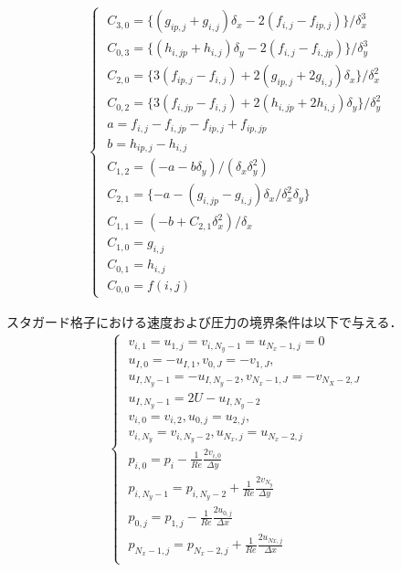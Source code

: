 \documentclass[twocolumn,oneside,a4paper]{article}
\begin{document}
\begin{eqnarray*}
\begin{cases}
\;C_{3,0} = \{ (g_{ip,j} + g_{i,j}) \delta_x - 2(f_{i,j}-f_{ip,j})\}/ \delta_x^3 \\
\;C_{0,3} = \{ (h_{i,jp} + h_{i,j}) \delta_y - 2(f_{i,j}-f_{i,jp})\}/ \delta_y^3 \\
\;C_{2,0} = \{ 3(f_{ip,j} - f_{i,j})  + 2(g_{ip,j}+2g_{i,j}) \delta_x \}/ \delta_x^2 \\
\;C_{0,2} = \{ 3(f_{i,jp} - f_{i,j})  + 2(h_{i,jp}+2h_{i,j}) \delta_y \}/ \delta_y^2 \\
\;a = f_{i,j} - f_{i,jp} - f_{ip,j} + f_{ip,jp} \\
\;b = h_{ip,j} - h_{i,j} \\
\;C_{1,2} = (-a-b\delta_y) / (\delta_x \delta_y^2)\\
\;C_{2,1} = \{  -a-(g_{i,jp} - g_{i,j})  \delta_x / \delta_x^2 \delta_y  \}\\
\;C_{1,1} = (-b+C_{2,1}\delta_x^2)/\delta_x\\
\;C_{1,0} = g_{i,j} \\
\;C_{0,1} = h_{i,j} \\
\;C_{0,0} = f(i,j)

\end{cases}  
\end{eqnarray*}

スタガード格子における速度および圧力の境界条件は以下で与える．
\begin{eqnarray}\label{eq:vcondition}
\begin{cases}
\;v_{i,1} = u_{1,j} = v_{i,N_y-1} = u_{N_x-1,j} = 0\nonumber\\
\;u_{I,0} = -u_{I,1}, v_{0,J} = -v_{1,J}, \nonumber\\
\; u_{I,N_y-1} = -u_{I,N_y-2}, v_{N_x-1,J} = -v_{N_X-2,J} \nonumber\\
\; u_{I,N_y-1} = 2U - u_{I,N_y-2} \nonumber\\
\; v_{i,0} = v_{i,2}, u_{0,j} = u_{2,j}, \nonumber\\
\; v_{i,N_y} = v_{i,N_y-2}, u_{N_x,j} = u_{N_x-2,j} \\
\;p_{i,0} = p_i - \frac{1}{Re}\frac{2v_{i,0}}{\Delta y} \nonumber\\
\;p_{i,N_y-1} = p_{i,N_y-2} + \frac{1}{Re}\frac{2v_{N_y}}{\Delta y} \nonumber\\
\;p_{0,j} = p_{1,j} - \frac{1}{Re}\frac{2u_{0,j}}{\Delta x} \nonumber\\
\;p_{N_x-1,j} = p_{N_x-2,j} + \frac{1}{Re}\frac{2u_{Nx,j}}{\Delta x}  \\
\end{cases}  
\end{eqnarray}
\end{document}

